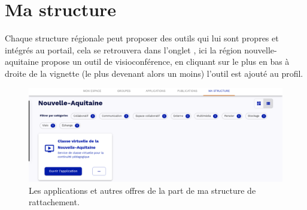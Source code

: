 \section{Ma structure}
Chaque structure régionale peut proposer des outils qui lui sont propres et intégrés au portail, cela se retrouvera dans l'onglet , ici la région nouvelle-aquitaine propose un outil de visioconférence, en cliquant sur le plus en bas à droite de la vignette (le plus devenant alors un moins) l'outil est ajouté au profil.
\begin{figure}
	\centering
	\includegraphics{./Captures/portail.accueil.ma.structure.png}
	\caption{Les applications et autres offres de la part de ma structure de rattachement.}
\end{figure}
